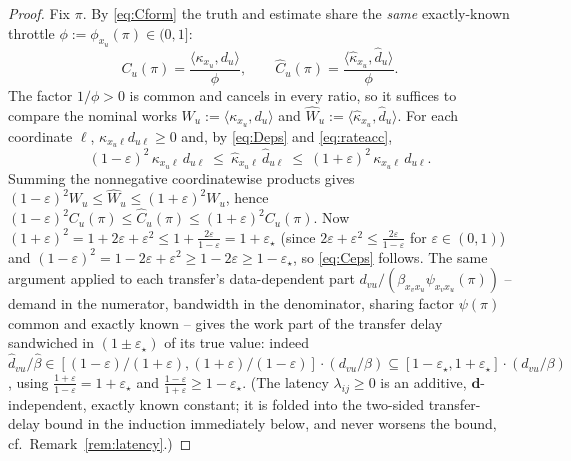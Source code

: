 \documentclass{amsart}
\theoremstyle{definition}
\newcommand{\Chat}{\widehat{C}}
\begin{document}
\begin{proof}
Fix $\pi$. By \eqref{eq:Cform} the truth and estimate share the \emph{same}
exactly-known throttle $\phi:=\phi_{x_u}(\pi)\in(0,1]$:
\[
C_u(\pi)=\frac{\langle\kappa_{x_u},d_u\rangle}{\phi},
\qquad
\Chat_u(\pi)=\frac{\langle\widehat\kappa_{x_u},\widehat d_u\rangle}{\phi}.
\]
The factor $1/\phi>0$ is common and cancels in every ratio, so it suffices to
compare the nominal works $W_u:=\langle\kappa_{x_u},d_u\rangle$ and
$\widehat W_u:=\langle\widehat\kappa_{x_u},\widehat d_u\rangle$. For each
coordinate $\ell$, $\kappa_{x_u\ell}d_{u\ell}\ge0$ and, by \eqref{eq:Deps} and
\eqref{eq:rateacc},
\[
(1-\varepsilon)^2\,\kappa_{x_u\ell}\,d_{u\ell}
\ \le\ \widehat\kappa_{x_u\ell}\,\widehat d_{u\ell}
\ \le\ (1+\varepsilon)^2\,\kappa_{x_u\ell}\,d_{u\ell}.
\]
Summing the nonnegative coordinatewise products gives
$(1-\varepsilon)^2 W_u\le\widehat W_u\le(1+\varepsilon)^2 W_u$, hence
$(1-\varepsilon)^2 C_u(\pi)\le\Chat_u(\pi)\le(1+\varepsilon)^2 C_u(\pi)$. Now
$(1+\varepsilon)^2=1+2\varepsilon+\varepsilon^2\le1+\frac{2\varepsilon}{1-\varepsilon}
=1+\varepsilon_\star$ (since $2\varepsilon+\varepsilon^2\le\frac{2\varepsilon}{1-\varepsilon}$
for $\varepsilon\in(0,1)$) and $(1-\varepsilon)^2=1-2\varepsilon+\varepsilon^2
\ge1-2\varepsilon\ge1-\varepsilon_\star$, so \eqref{eq:Ceps} follows. The same
argument applied to each transfer's data-dependent part
$d_{vu}/(\beta_{x_vx_u}\psi_{x_vx_u}(\pi))$ -- demand in the numerator,
bandwidth in the denominator, sharing factor $\psi(\pi)$ common and exactly
known -- gives the work part of the transfer delay sandwiched in
$(1\pm\varepsilon_\star)$ of its true value: indeed
$\widehat d_{vu}/\widehat\beta\in[(1-\varepsilon)/(1+\varepsilon),
(1+\varepsilon)/(1-\varepsilon)]\cdot(d_{vu}/\beta)\subseteq
[1-\varepsilon_\star,1+\varepsilon_\star]\cdot(d_{vu}/\beta)$, using
$\frac{1+\varepsilon}{1-\varepsilon}=1+\varepsilon_\star$ and
$\frac{1-\varepsilon}{1+\varepsilon}\ge1-\varepsilon_\star$. (The latency
$\lambda_{ij}\ge0$ is an additive, $\mathbf d$-independent, exactly known
constant; it is folded into the two-sided transfer-delay bound in the induction
immediately below, and never worsens the bound, cf.\ Remark~\ref{rem:latency}.)


\end{proof}
\end{document}
